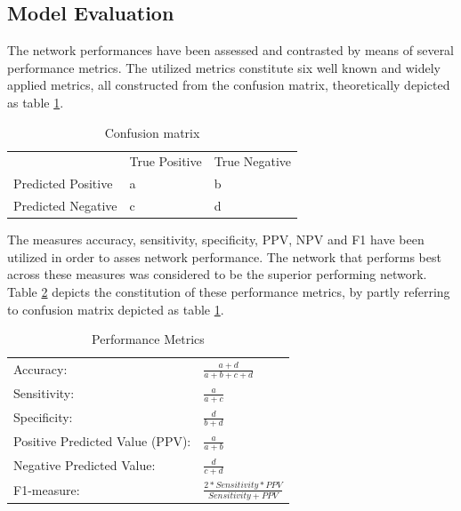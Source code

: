 \documentclass[12pt]{article}
\begin{document}
\clearpage
\subsection{Model Evaluation}
The network performances have been assessed and contrasted by means of several performance metrics. The utilized metrics constitute six well known and widely applied metrics, all constructed from the confusion matrix, theoretically depicted as table \ref{table:confusion}.

\bigskip
\bgroup
\def\arraystretch{1.6}%
\begin{table}[h]
\caption{Confusion matrix}
\label{table:confusion}
\begin{tabular}{lll}
                                        & True Positive          & True Negative          \\ \cline{2-3} 
\multicolumn{1}{l|}{Predicted Positive} & \multicolumn{1}{l|}{a} & \multicolumn{1}{l|}{b} \\ \cline{2-3} 
\multicolumn{1}{l|}{Predicted Negative} & \multicolumn{1}{l|}{c} & \multicolumn{1}{l|}{d} \\ \cline{2-3} 
\end{tabular}
\end{table}
\egroup
\bigskip

The measures accuracy, sensitivity, specificity, PPV, NPV and F1 have been utilized in order to asses network performance. The network that performs best across these measures was considered to be the superior performing network. Table \ref{table:metrics} depicts the constitution of these performance metrics, by partly referring to confusion matrix depicted as table \ref{table:confusion}. 

\bigskip
\bgroup
\def\arraystretch{1.8}%
\begin{table}[h]
\caption{Performance Metrics}
\label{table:metrics}
\begin{tabular}{ll}
\hline
Accuracy:                       & \(\frac{\!\!\!\!\!\!\!\!\!\!\!\!\!\!a+d}{a+b+c+d}\) \\
Sensitivity:                    & \(\frac{a}{a+c}\)                                   \\
Specificity:                    & \(\frac{d}{b+d}\)                                   \\
Positive Predicted Value (PPV): & \(\frac{a}{a+b}\)                                   \\
Negative Predicted Value:       & \(\frac{d}{c+d}\)                                   \\
F1-measure:                     & \(\frac{2*Sensitivity*PPV}{Sensitivity+PPV}\)       \\ \hline
\end{tabular}
\end{table}
\egroup

\newpage



\end{document}
